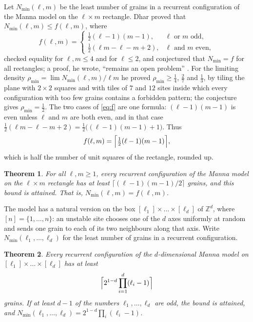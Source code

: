 \documentclass[11pt]{amsart}
\newtheorem{mainthm}{Theorem}
\theoremstyle{definition}
\newcommand{\ZZ}{\mathbb{Z}}
\newcommand{\Nmin}{N_{\min}}
\begin{document}
Let $\Nmin(\ell,m)$ be the least number of grains in a recurrent configuration of the Manna model on the $\ell\times m$ rectangle. Dhar proved that $\Nmin(\ell,m)\le f(\ell,m)$, where
\begin{equation}\label{eq:f}
f(\ell,m)=\begin{cases}\tfrac12(\ell-1)(m-1), & \ell\text{ or }m\text{ odd},\\[2pt] \tfrac12(\ell m-\ell-m+2), & \ell\text{ and }m\text{ even},\end{cases}
\end{equation}
checked equality for $\ell,m\le4$ and for $\ell\le 2$, and conjectured that $\Nmin=f$ for all rectangles; a proof, he wrote, ``remains an open problem'' \cite[\S6]{Dha99b}. For the limiting density $\rho_{\min}=\lim\Nmin(\ell,m)/\ell m$ he proved $\rho_{\min}\ge\tfrac14$, $\tfrac27$ and $\tfrac13$, by tiling the plane with $2\times2$ squares and with tiles of $7$ and $12$ sites inside which every configuration with too few grains contains a forbidden pattern; the conjecture gives $\rho_{\min}=\tfrac12$. The two cases of \eqref{eq:f} are one formula: $(\ell-1)(m-1)$ is even unless $\ell$ and $m$ are both even, and in that case $\tfrac12(\ell m-\ell-m+2)=\tfrac12\bigl((\ell-1)(m-1)+1\bigr)$. Thus
\begin{equation}\label{eq:fceil}
f(\ell,m)=\Bigl\lceil \tfrac12(\ell-1)(m-1)\Bigr\rceil,
\end{equation}
which is half the number of unit squares of the rectangle, rounded up.

\begin{mainthm}\label{thm:A}
For all $\ell,m\ge1$, every recurrent configuration of the Manna model on the $\ell\times m$ rectangle has at least $\lceil(\ell-1)(m-1)/2\rceil$ grains, and this bound is attained. That is, $\Nmin(\ell,m)=f(\ell,m)$.
\end{mainthm}

The model has a natural version on the box $[\ell_1]\times\dots\times[\ell_d]$ of $\ZZ^d$, where $[n]=\{1,\dots,n\}$: an unstable site chooses one of the $d$ axes uniformly at random and sends one grain to each of its two neighbours along that axis. Write $\Nmin(\ell_1,\dots,\ell_d)$ for the least number of grains in a recurrent configuration.

\begin{mainthm}\label{thm:B}
Every recurrent configuration of the $d$-dimensional Manna model on $[\ell_1]\times\dots\times[\ell_d]$ has at least
\[
\Bigl\lceil 2^{1-d}\prod_{i=1}^d(\ell_i-1)\Bigr\rceil
\]
grains. If at least $d-1$ of the numbers $\ell_1,\dots,\ell_d$ are odd, the bound is attained, and $\Nmin(\ell_1,\dots,\ell_d)=2^{1-d}\prod_i(\ell_i-1)$.
\end{mainthm}
\end{document}
